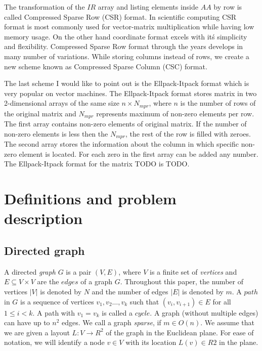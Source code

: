\documentclass[thesis=M,english]{FITthesis}[2012/10/20]
\begin{document}
The transformation of the $IR$ array and listing elements inside $AA$ by row is called Compressed Sparse Row (CSR) format. In scientific computing CSR format is most commonly used for vector-matrix multiplication while having low memory usage. On the other hand coordinate format excels with it\'s simplicity and flexibility.
Compressed Sparse Row format through the years develops in many number of variations. 
While storing columns instead of rows, we create a new scheme known as Compressed Sparse Column (CSC) format.

The last scheme I would like to point out is the Ellpack-Itpack format which is very popular on vector machines. The Ellpack-Itpack format stores matrix in two 2-dimensional arrays of the same size $n \times N_{mpr}$, where $n$ is the number of rows of the original matrix and $N_{mpr}$ represents maximum of non-zero elements per row. The first array contains non-zero elements of original matrix. If the number of non-zero elements is less then the $N_{mpr}$, the rest of the row is filled with zeroes. The second array stores the information about the column in which specific non-zero element is located. For each zero in the first array can be added any number.
The Ellpack-Itpack format for the matrix TODO is TODO.

\section{Definitions and problem description}

\subsection{Directed graph}
A directed \textit{graph} $G$ is a pair $(V, E)$, where $V$ is a finite set of \textit{vertices} and $E \subseteq V \times V$ are the $edges$ of a graph $G$. Throughout this paper, the number of vertices $|V|$ is denoted by $N$ and the number of edges $|E|$ is denoted by $m$. A $path$ in $G$ is a sequence of vertices $v_1, v_2 \dots ,v_k$ such that $(v_i,v_{i+1}) \in E$ for all $1 \leq i < k$. A path with $v_1 = v_k$ is called a $cycle$. A graph (without multiple edges) can have up to $n^2$ edges. We call a graph \textit{sparse}, if $m \in O(n)$. We assume that we are given a layout $L : V \to R^2$ of the graph in the Euclidean plane. For ease of notation, we will identify a node $v \in V$ with its location $L(v) \in R2$ in the plane.
\end{document}
